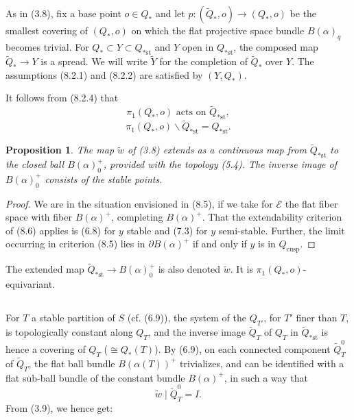 \documentclass[12pt,a4paper]{article}
\theoremstyle{plain}
\newtheorem{proposition}[theorem]{Proposition}
\theoremstyle{definition}
\theoremstyle{remark}
\begin{document}
\setcounter{section}{7}

\subsection{}
\label{8.6}

As in (3.8), fix a base point $o \in Q_*$ and let $p : (\widetilde{Q}_*, o) \to (Q_*, o)$ be the smallest covering of $(Q_*, o)$ on which the flat projective space bundle $B(\alpha)_q$ becomes trivial. For $Q_* \subset Y \subset Q_{*\text{st}}$ and $Y$ open in $Q_{*\text{st}}$, the composed map $\widetilde{Q}_* \to Y$ is a spread. We will write $\widetilde{Y}$ for the completion of $\widetilde{Q}_*$ over $Y$. The assumptions (8.2.1) and (8.2.2) are satisfied by $(Y, Q_*)$.

It follows from (8.2.4) that
\begin{equation}
\label{8.6.1}
\pi_1(Q_*, o) \text{ acts on } \widetilde{Q}_{*\text{st}},
\end{equation}
\begin{equation}
\label{8.6.2}
\pi_1(Q_*, o) \backslash \widetilde{Q}_{*\text{st}} = Q_{*\text{st}}.
\end{equation}

\begin{proposition}
\label{8.7}
The map $\widetilde{w}$ of (3.8) extends as a continuous map from $\widetilde{Q}_{*\text{st}}$ to the closed ball $B(\alpha)_0^+$, provided with the topology (5.4). The inverse image of $B(\alpha)_0^+$ consists of the stable points.
\end{proposition}

\begin{proof}
We are in the situation envisioned in (8.5), if we take for $\mathscr{E}$ the flat fiber space with fiber $B(\alpha)^+$, completing $B(\alpha)^+$. That the extendability criterion of (8.6) applies is (6.8) for $y$ stable and (7.3) for $y$ semi-stable. Further, the limit occurring in criterion (8.5) lies in $\partial B(\alpha)^+$ if and only if $y$ is in $Q_{\text{cusp}}$.
\end{proof}

The extended map $\widetilde{Q}_{*\text{st}} \to B(\alpha)_0^+$ is also denoted $\widetilde{w}$. It is $\pi_1(Q_*, o)$-equivariant.

\subsection{}
\label{8.8}

For $T$ a stable partition of $S$ (cf. (6.9)), the system of the $Q_{T'}$, for $T'$ finer than $T$, is topologically constant along $Q_T$, and the inverse image $\widetilde{Q}_T$ of $Q_T$ in $\widetilde{Q}_{*\text{st}}$ is hence a covering of $Q_T$ ($\cong Q_*(T)$). By (6.9), on each connected component $\widetilde{Q}_T^0$ of $\widetilde{Q}_T$, the flat ball bundle $B(\alpha(T))^+$ trivializes, and can be identified with a flat sub-ball bundle of the constant bundle $B(\alpha)^+$, in such a way that
\begin{equation}
\label{8.8.1}
\widetilde{w} \mid \widetilde{Q}_T^0 = I.
\end{equation}
From (3.9), we hence get:
\end{document}
